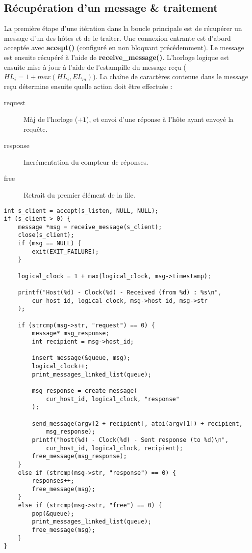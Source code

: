 \subsection{Récupération d'un message \& traitement}
La première étape d'une itération dans la boucle principale est de récupérer un message d'un des hôtes et de le traiter.  Une connexion entrante est d'abord acceptée avec \textbf{accept()} (configuré en non bloquant précédemment). Le message est ensuite récupéré à l'aide de \textbf{receive\_message()}. L'horloge logique est ensuite mise à jour à l'aide de l'estampille du message reçu ($HL_i = 1 + max(HL_i, EL_m)$). La chaîne de caractères contenue dans le message reçu détermine ensuite quelle action doit être effectuée :

\begin{description}
    \item[request] Màj de l'horloge ($+1$), et envoi d'une réponse à l'hôte ayant envoyé la requête.
    \item[response] Incrémentation du compteur de réponses.
    \item[free] Retrait du premier élément de la file.
\end{description}

\begin{lstlisting}[caption={Récupération d'un message \& traitement}]
int s_client = accept(s_listen, NULL, NULL);
if (s_client > 0) {
    message *msg = receive_message(s_client);
    close(s_client);
    if (msg == NULL) {
        exit(EXIT_FAILURE);
    }

    logical_clock = 1 + max(logical_clock, msg->timestamp);

    printf("Host(%d) - Clock(%d) - Received (from %d) : %s\n",
        cur_host_id, logical_clock, msg->host_id, msg->str
    );

    if (strcmp(msg->str, "request") == 0) {
        message* msg_response;
        int recipient = msg->host_id;

        insert_message(&queue, msg);
        logical_clock++;
        print_messages_linked_list(queue);

        msg_response = create_message(
            cur_host_id, logical_clock, "response"
        );

        send_message(argv[2 + recipient], atoi(argv[1]) + recipient,
            msg_response);
        printf("host(%d) - Clock(%d) - Sent response (to %d)\n",
            cur_host_id, logical_clock, recipient);
        free_message(msg_response);
    }
    else if (strcmp(msg->str, "response") == 0) {
        responses++;
        free_message(msg);
    }
    else if (strcmp(msg->str, "free") == 0) {
        pop(&queue);
        print_messages_linked_list(queue);
        free_message(msg);
    }
}
\end{lstlisting}

